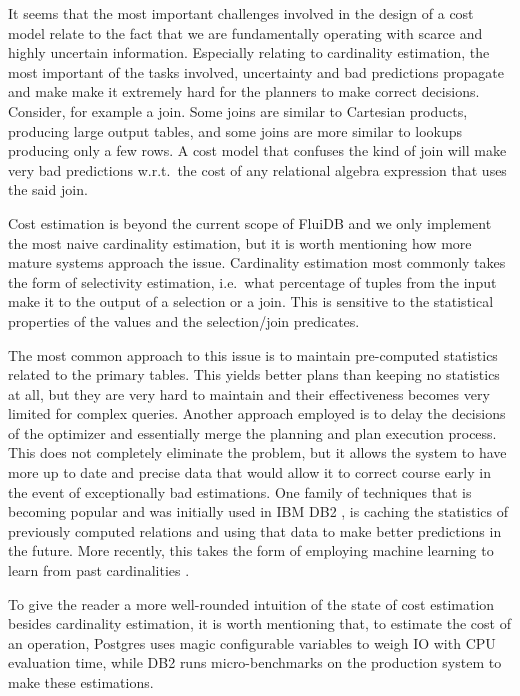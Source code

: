 It seems that the most important challenges involved in the design of
a cost model relate to the fact that we are fundamentally operating
with scarce and highly uncertain information. Especially relating to
cardinality estimation, the most important of the tasks involved,
uncertainty and bad predictions propagate and make make it extremely
hard for the planners to make correct decisions. Consider, for example a
join. Some joins are similar to Cartesian products, producing large
output tables, and some joins are more similar to lookups producing
only a few rows. A cost model that confuses the kind of join will make
very bad predictions w.r.t.\ the cost of any relational algebra
expression that uses the said join.

Cost estimation is beyond the current scope of FluiDB and we only implement
the most naive cardinality estimation, but it is worth mentioning how
more mature systems approach the issue. Cardinality estimation most
commonly takes the form of selectivity estimation, i.e.\  what
percentage of tuples from the input make it to the output of a
selection or a join. This is sensitive to the statistical
properties of the values and the selection/join predicates.

The most common approach to this issue is to maintain pre-computed
statistics related to the primary tables. This yields better plans than
keeping no statistics at all, but they are very hard to maintain and their
effectiveness becomes very limited for complex queries. Another
approach employed is to delay the decisions of the optimizer and
essentially merge the planning and plan execution process. This does not
completely eliminate the problem, but it allows the system to have more
up to date and precise data that would allow it to correct course
early in the event of exceptionally bad estimations. One family of
techniques that is becoming popular and was initially used in IBM DB2
\cite{stillgerLEODB2LearningOptimizer2001}, is caching the statistics
of previously computed relations and using that data to make better
predictions in the future. More recently, this takes the form of
employing machine learning to learn from past cardinalities
\cite{ortizEmpiricalAnalysisDeep2019}.

To give the reader a more well-rounded intuition of the state of cost
estimation besides cardinality estimation, it is worth mentioning that,
to estimate the cost of an operation, Postgres uses magic configurable
variables to weigh IO with CPU evaluation time, while DB2 runs
micro-benchmarks on the production system to make these estimations.


